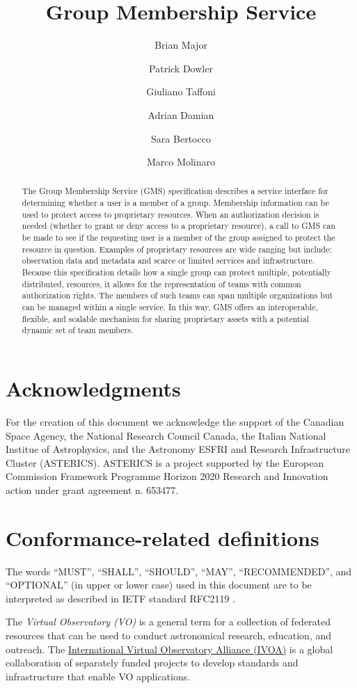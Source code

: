 \documentclass[11pt,a4paper]{ivoa}
\title{Group Membership Service}
\author{Brian Major}
\author{Patrick Dowler}
\author{Giuliano Taffoni}
\author{Adrian Damian}
\author{Sara Bertocco}
\author{Marco Molinaro}
\begin{document}
\begin{abstract}

The Group Membership Service (GMS) specification describes a service interface for determining whether a user is a member of a group.  Membership information can be used to protect access to proprietary resources.  When an authorization decision is needed (whether to grant or deny access to a proprietary resource), a call to GMS can be made to see if the requesting user is a member of the group assigned to protect the resource in question.  Examples of proprietary resources are wide ranging but include: observation data and metadata and scarce or limited services and infrastructure.  Because this specification details how a single group can protect multiple, potentially distributed, resources, it allows for the representation of teams with common authorization rights.  The members of such teams can span multiple organizations but can be managed within a single service.  In this way, GMS offers an interoperable, flexible, and scalable mechanism for sharing proprietary assets with a potential dynamic set of team members.

\end{abstract}

\section*{Acknowledgments}
For the creation of this document we acknowledge the support of the Canadian Space Agency, the National Research Council Canada, the Italian National Institue of Astrophysics, and the Astronomy ESFRI and Research Infrastructure Cluster (ASTERICS).  ASTERICS is a project supported by the European Commission Framework Programme Horizon 2020 Research and Innovation action under grant agreement n. 653477.

\section*{Conformance-related definitions}

The words ``MUST'', ``SHALL'', ``SHOULD'', ``MAY'', ``RECOMMENDED'', and
``OPTIONAL'' (in upper or lower case) used in this document are to be
interpreted as described in IETF standard RFC2119 \citep{std:RFC2119}.

The \emph{Virtual Observatory (VO)} is a
general term for a collection of federated resources that can be used
to conduct astronomical research, education, and outreach.
The \href{http://www.ivoa.net}{International
Virtual Observatory Alliance (IVOA)} is a global
collaboration of separately funded projects to develop standards and
infrastructure that enable VO applications.
\end{document}
